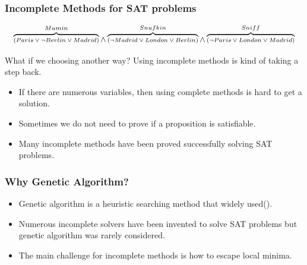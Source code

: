 \begin{frame}
	\frametitle{Incomplete Methods for SAT problems}
	\begin{equation*}
	\scriptsize
		\overbrace{(Paris \vee \neg Berlin \vee Madrid)}^{Mumin} \wedge \overbrace{(\neg Madrid \vee London \vee Berlin)}^{Snufkin} \wedge \overbrace{(\neg Paris \vee London \vee Madrid)}^{Sniff}
	\end{equation*}
	\large	
	\begin{alertblock}{What if we choosing another way?}
		Using incomplete methods is kind of taking a step back.
		\begin{itemize}
	\normalsize
		\item If there are numerous variables, then using complete methods is hard to get a solution.
		\item Sometimes we do not need to prove if a proposition is satisfiable.
		\item Many incomplete methods have been proved successfully solving SAT problems\parencite{biere2009handbook}.
	\end{itemize}
	\end{alertblock}
	
	
\end{frame}

\begin{frame}
	\frametitle{Why Genetic Algorithm?}
	\Large
	\begin{itemize}
		\item Genetic algorithm is a heuristic searching method that widely used(\citeauthor{Voss}).
		\item Numerous incomplete solvers have been invented to solve SAT problems \parencite{marchiori1999flipping, selman1994noise} but genetic algorithm was rarely considered.
		\item The main challenge for incomplete methods is how to escape local minima.
	\end{itemize}
	
\end{frame}